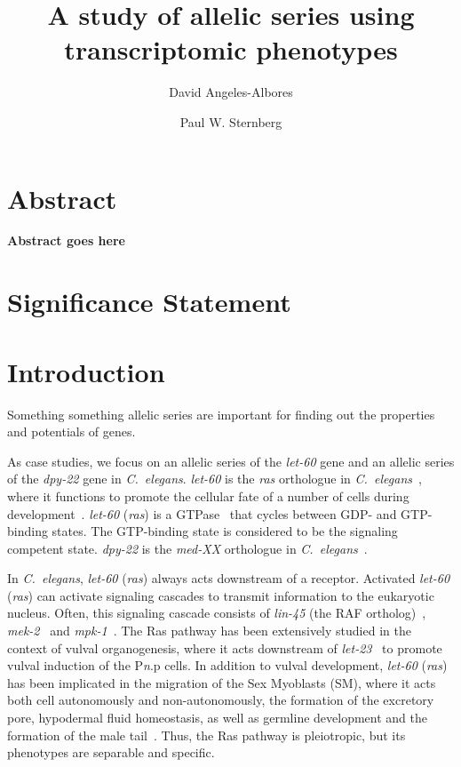 \documentclass[10pt, onecolumn]{article}
\title{A study of allelic series using transcriptomic phenotypes}
\author[1,2]{David Angeles-Albores}
\author[1,2,*]{Paul W. Sternberg}
\affil[1]{Division of Biology and Biological Engineering, Caltech,
Pasadena, CA, 91125, USA}
\affil[2]{Howard Hughes Medical Institute, Caltech, Pasadena, CA, 91125, USA}
\affil[*]{Corresponding author. Contact: pws@caltech.edu}
\newcommand{\cel}{\emph{C.~elegans}}
\newcommand{\gene}[1]{\mbox{\emph{#1}}}
\newcommand{\ras}{\gene{let-60} (\emph{ras})}
\begin{document}
\maketitle

\section*{Abstract}

\textbf{
Abstract goes here
}

\vspace{10mm}

\section*{Significance Statement}


\vspace{10mm}

\linenumbers{}

\section*{Introduction}
Something something allelic series are important for finding out the properties
and potentials of genes.

As case studies, we focus on an allelic series of the \gene{let-60} gene and an
allelic series of the \gene{dpy-22} gene in \cel{}. \gene{let-60} is the
\gene{ras} orthologue in \cel{}~\cite{Han1990a}, where it functions to promote
the cellular fate of a number of cells during development~\cite{Yochem1997}.
\ras{} is a GTPase~\cite{Han1990a} that cycles between GDP- and GTP-binding
states. The GTP-binding state is considered to be the signaling
competent state. \gene{dpy-22} is the \gene{med-XX} orthologue in
\cel{}~\cite{}.

In \cel{}, \ras{} always acts downstream of a receptor. Activated
\ras{} can activate signaling cascades to transmit information to the eukaryotic
nucleus. Often, this signaling cascade consists of \gene{lin-45} (the RAF
ortholog)~\cite{Han1993a}, \gene{mek-2}~\cite{Wu1995} and
\gene{mpk-1}~\cite{Lackner1994}. The Ras pathway has been extensively studied in
the context of vulval organogenesis, where it acts downstream of
\gene{let-23}~\cite{Sternberg1995} to promote vulval induction of the
P\emph{n}.p cells. In addition to vulval development, \ras{} has been implicated
in the migration of the Sex Myoblasts (SM), where it acts both cell autonomously
and non-autonomously, the formation of the excretory pore, hypodermal fluid
homeostasis, as well as germline development and the formation of the male
tail~\cite{Sundaram2006}. Thus, the Ras pathway is pleiotropic, but its
phenotypes are separable and specific.
\end{document}
